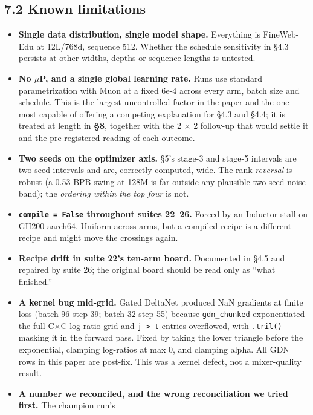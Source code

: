 \subsection{7.2 Known limitations}\label{known-limitations}

\begin{itemize}
\tightlist
\item
  \textbf{Single data distribution, single model shape.} Everything is FineWeb-Edu at 12L/768d,
  sequence 512. Whether the schedule sensitivity in \S4.3 persists at other widths, depths or
  sequence lengths is untested.
\item
  \textbf{No $\mu$P, and a single global learning rate.} Runs use standard parametrization with Muon at a
  fixed 6e-4 across every arm, batch size and schedule. This is the largest uncontrolled factor in
  the paper and the one most capable of offering a competing explanation for \S4.3 and \S4.4; it is
  treated at length in \textbf{\S8}, together with the 2 $\times$ 2 follow-up that would settle it and the
  pre-registered reading of each outcome.
\item
  \textbf{Two seeds on the optimizer axis.} \S5's stage-3 and stage-5 intervals are two-seed intervals
  and are, correctly computed, wide. The rank \emph{reversal} is robust (a 0.53 BPB swing at 128M is
  far outside any plausible two-seed noise band); the \emph{ordering within the top four} is not.
\item
  \textbf{\texttt{compile\ =\ False} throughout suites 22--26.} Forced by an Inductor stall on GH200 aarch64.
  Uniform across arms, but a compiled recipe is a different recipe and might move the crossings
  again.
\item
  \textbf{Recipe drift in suite 22's ten-arm board.} Documented in \S4.5 and repaired by suite 26; the
  original board should be read only as ``what finished.''
\item
  \textbf{A kernel bug mid-grid.} Gated DeltaNet produced NaN gradients at finite loss (batch 96
  step 39; batch 32 step 55) because \texttt{gdn\_chunked} exponentiated the full C$\times$C log-ratio grid and
  \texttt{j\ \textgreater{}\ t} entries overflowed, with \texttt{.tril()} masking it in the forward pass. Fixed by taking the
  lower triangle before the exponential, clamping log-ratios at max 0, and clamping alpha. All GDN
  rows in this paper are post-fix. This was a kernel defect, not a mixer-quality result.
\item
  \textbf{A number we reconciled, and the wrong reconciliation we tried first.} The champion run's

\end{itemize}
